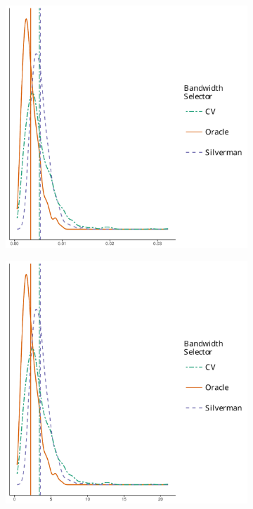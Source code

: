 \begin{figure}[htbp]
    \centering
    \begin{subfigure}[b]{0.45\textwidth}
        \includegraphics[width=\textwidth]{output/ise-relative-histogram}
    \end{subfigure}
    \begin{subfigure}[b]{0.45\textwidth}
        \includegraphics[width=\textwidth]{output/ise-normalized-histogram}

\end{subfigure}
\end{figure}
